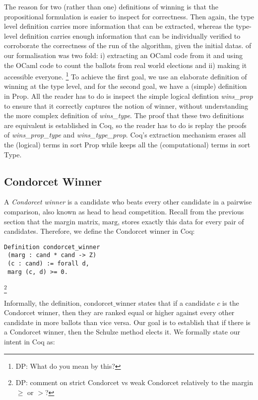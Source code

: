 \documentclass[compsoc,conference,a4paper,10pt,times]{IEEEtran}
\begin{document}
The reason for two (rather than one) definitions of winning is that
the propositional formulation is easier to inspect for correctness.
Then again, the type level definition carries more information that
can be extracted, whereas the type-level definition carries
enough information that can be individually verified to corroborate
the correctness of the run of the algorithm, given the initial
datas. 
of our formalisation was two fold: i) extracting an OCaml 
code from it and using the OCaml code 
to count the ballots from real world elections and ii)
making it accessible everyone.  
\footnote{DP: What do you mean by this?}
To achieve the 
first goal, we use an elaborate  definition of winning at the type
level,
and for the second goal, we have a (simple) definition in Prop. 
All the reader has to do is inspect the simple logical defintion 
\textit{wins\_prop} to ensure that it correctly captures the notion 
of winner,  without understanding the more complex 
definition of \textit{wins\_type}.  The proof that these two definitions 
are equivalent is established in Coq, so the reader 
has to do is replay the proofs of  \textit{wins\_prop\_type} and 
\textit{wins\_type\_prop}.  Coq's extraction mechanism erases all the (logical) terms in sort Prop while 
keeps all the (computational) terms in sort Type. 


 \subsection{Condorcet Winner}
	A \textit{Condorcet winner} is a candidate who beats every other candidate in a 
	pairwise comparison, also known as head to head competition. 
	Recall from the previous section that the margin matrix,
  $\mathrm{marg}$, 
	stores exactly this data for every pair of candidates.
	Therefore, we define the Condorcet winner in Coq:

\begin{verbatim}
Definition condorcet_winner 
 (marg : cand * cand -> Z) 
 (c : cand) := forall d, 
 marg (c, d) >= 0.
\end{verbatim}
\footnote{DP: comment on strict Condorcet vs weak Condorcet
relatively to the margin $\geq$ or $>$?}

  Informally, the definition,  $\mathrm{condorcet\_winner}$ states that 
  if a candidate $c$  is the Condorcet winner, then they are
  ranked equal or higher against
  every other candidate in more ballots than vice versa. 
  Our goal is to establish that if there is a 
  Condorcet winner, then the Schulze method
  elects it. We formally state our intent 
  in Coq as:
 	
\end{document}
